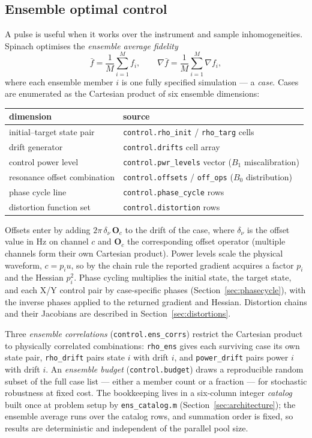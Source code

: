 \documentclass[11pt,a4paper]{article}
\newcommand{\code}[1]{\texttt{#1}}
\begin{document}
\subsection{Ensemble optimal control}
\label{sec:ensembles}

A pulse is useful when it works over the instrument and sample
inhomogeneities. Spinach optimises the \emph{ensemble average fidelity}
\begin{equation}
  \bar{f}=\frac{1}{M}\sum_{i=1}^{M}f_i,
  \qquad
  \nabla\bar{f}=\frac{1}{M}\sum_{i=1}^{M}\nabla f_i,
\end{equation}
where each ensemble member $i$ is one fully specified simulation --- a
\emph{case}. Cases are enumerated as the Cartesian product of six
ensemble dimensions:
\begin{center}
\begin{tabular}{ll}
\toprule
dimension & source \\
\midrule
initial--target state pair      & \code{control.rho\_init} / \code{rho\_targ} cells\\
drift generator                 & \code{control.drifts} cell array\\
control power level             & \code{control.pwr\_levels} vector ($B_1$ miscalibration)\\
resonance offset combination    & \code{control.offsets} / \code{off\_ops} ($B_0$ distribution)\\
phase cycle line                & \code{control.phase\_cycle} rows\\
distortion function set         & \code{control.distortion} rows\\
\bottomrule
\end{tabular}
\end{center}
Offsets enter by adding $2\pi\,\delta_{\nu}\,\mathbf{O}_c$ to the drift of
the case, where $\delta_\nu$ is the offset value in Hz on channel $c$ and
$\mathbf{O}_c$ the corresponding offset operator (multiple channels form
their own Cartesian product). Power levels scale the physical waveform,
$c=p_i u$, so by the chain rule the reported gradient acquires a factor
$p_i$ and the Hessian $p_i^2$. Phase cycling multiplies the initial
state, the target state, and each X/Y control pair by case-specific
phases (Section~\ref{sec:phasecycle}), with the inverse phases applied to
the returned gradient and Hessian. Distortion chains and their Jacobians
are described in Section~\ref{sec:distortions}.

Three \emph{ensemble correlations} (\code{control.ens\_corrs}) restrict
the Cartesian product to physically correlated combinations:
\code{rho\_ens} gives each surviving case its own state pair,
\code{rho\_drift} pairs state $i$ with drift $i$, and \code{power\_drift}
pairs power $i$ with drift $i$. An \emph{ensemble budget}
(\code{control.budget}) draws a reproducible random subset of the full
case list --- either a member count or a fraction --- for stochastic
robustness at fixed cost. The bookkeeping lives in a six-column integer
\emph{catalog} built once at problem setup by \code{ens\_catalog.m}
(Section~\ref{sec:architecture}); the ensemble average runs over the
catalog rows, and summation order is fixed, so results are deterministic
and independent of the parallel pool size.
\end{document}
